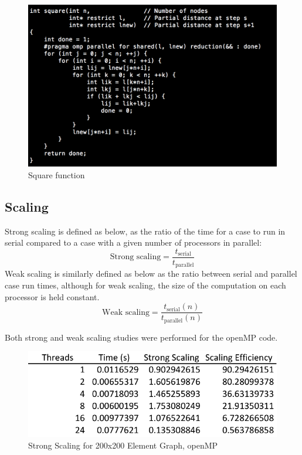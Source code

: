 \documentclass{article}
\begin{document}
	\begin{figure}[h!]
		\begin{center}
			\includegraphics[width=0.5\columnwidth]{square}
			\caption{Square function}
			\label{square}
		\end{center}
	\end{figure}
		
\subsection{Scaling}
Strong scaling is defined as below, as the ratio of the time for a case to run in serial compared to a case with a given number of processors in parallel:
\begin{equation}
\textrm{Strong scaling} = \frac{t_{\textrm{serial}}}{t_{\textrm{parallel}}}
\end{equation}
Weak scaling is similarly defined as below as the ratio between serial and parallel case run times, although for weak scaling, the size of the computation on each processor is held constant. \\
\begin{equation}
\textrm{Weak scaling} = \frac{t_{\textrm{serial}}(n)}{t_{\textrm{parallel}}(n)}
\end{equation}

Both strong and weak scaling studies were performed for the openMP code.

	\begin{figure}[h!]
		\begin{center}
			\includegraphics[width=0.5\columnwidth]{st_table_mp}
			\caption{Strong Scaling for 200x200 Element Graph, openMP}
			\label{mp_st_t}
		\end{center}
	\end{figure}
	
\end{document}
